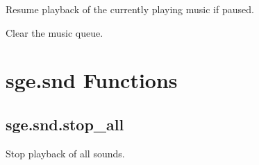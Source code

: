 \documentclass[letterpaper,10pt,english]{sphinxmanual}
\begin{document}

\begin{fulllineitems}
\label{snd:sge.snd.Music.unpause}
Resume playback of the currently playing music if paused.

\end{fulllineitems}


\begin{fulllineitems}
\label{snd:sge.snd.Music.clear_queue}
Clear the music queue.

\end{fulllineitems}



\section{sge.snd Functions}
\label{snd:sge-snd-functions}

\subsection{sge.snd.stop\_all}
\label{snd:sge-snd-stop-all}

\begin{fulllineitems}
\label{snd:sge.snd.stop_all}
Stop playback of all sounds.

\end{fulllineitems}
\end{document}

